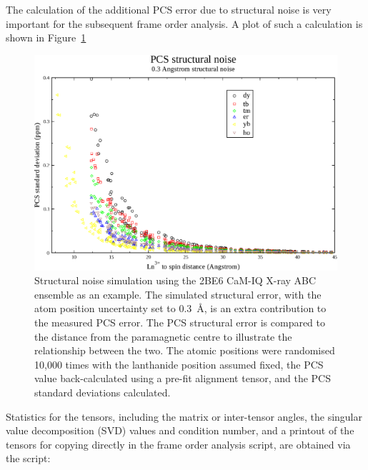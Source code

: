 The calculation of the additional PCS error due to structural noise is very important for the subsequent frame order analysis.
A plot of such a calculation is shown in Figure~\ref{fig: CaM-IQ ABC X-ray structural noise}

\begin{figure}
  \centerline{
    \includegraphics[width=\textwidth]{images/cam_iq_abc_whole_structural_noise}
  }
  \caption[Structural noise and the PCS error.]{
    Structural noise simulation using the 2BE6 CaM-IQ X-ray ABC ensemble as an example.
    The simulated structural error, with the atom position uncertainty set to 0.3~\AA, is an extra contribution to the measured PCS error.
    The PCS structural error is compared to the distance from the paramagnetic centre to illustrate the relationship between the two.
    The atomic positions were randomised 10,000 times with the lanthanide position assumed fixed, the PCS value back-calculated using a pre-fit alignment tensor, and the PCS standard deviations calculated.
  }
  \label{fig: CaM-IQ ABC X-ray structural noise}
\end{figure}


Statistics for the tensors, including the matrix or inter-tensor angles, the singular value decomposition (SVD) values and condition number, and a printout of the tensors for copying directly in the frame order analysis script, are obtained via the script:

